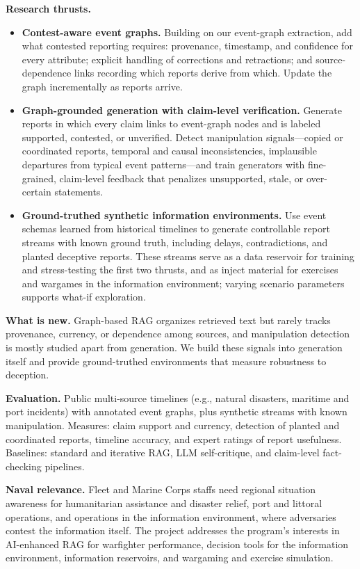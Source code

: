 \documentclass[11pt]{article}
\newcommand{\head}[1]{{\color{navy}\textbf{#1}}\enspace}
\begin{document}
\head{Research thrusts.}
\begin{itemize}
\item \textbf{Contest-aware event graphs.} Building on our event-graph extraction, add what contested reporting requires: provenance, timestamp, and confidence for every attribute; explicit handling of corrections and retractions; and source-dependence links recording which reports derive from which. Update the graph incrementally as reports arrive.
\item \textbf{Graph-grounded generation with claim-level verification.} Generate reports in which every claim links to event-graph nodes and is labeled supported, contested, or unverified. Detect manipulation signals---copied or coordinated reports, temporal and causal inconsistencies, implausible departures from typical event patterns---and train generators with fine-grained, claim-level feedback that penalizes unsupported, stale, or over-certain statements.
\item \textbf{Ground-truthed synthetic information environments.} Use event schemas learned from historical timelines to generate controllable report streams with known ground truth, including delays, contradictions, and planted deceptive reports. These streams serve as a data reservoir for training and stress-testing the first two thrusts, and as inject material for exercises and wargames in the information environment; varying scenario parameters supports what-if exploration.
\end{itemize}

\head{What is new.} Graph-based RAG organizes retrieved text but rarely tracks provenance, currency, or dependence among sources, and manipulation detection is mostly studied apart from generation. We build these signals into generation itself and provide ground-truthed environments that measure robustness to deception.

\head{Evaluation.} Public multi-source timelines (e.g., natural disasters, maritime and port incidents) with annotated event graphs, plus synthetic streams with known manipulation. Measures: claim support and currency, detection of planted and coordinated reports, timeline accuracy, and expert ratings of report usefulness. Baselines: standard and iterative RAG, LLM self-critique, and claim-level fact-checking pipelines.

\head{Naval relevance.} Fleet and Marine Corps staffs need regional situation awareness for humanitarian assistance and disaster relief, port and littoral operations, and operations in the information environment, where adversaries contest the information itself. The project addresses the program's interests in AI-enhanced RAG for warfighter performance, decision tools for the information environment, information reservoirs, and wargaming and exercise simulation.
\end{document}
